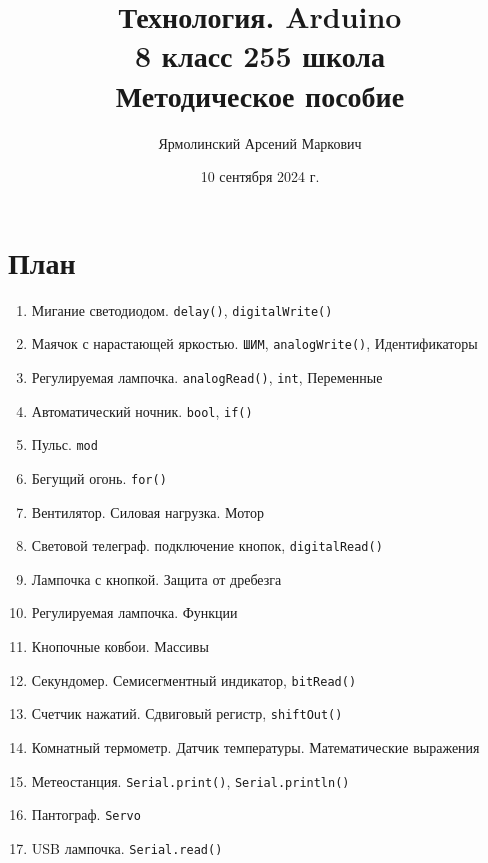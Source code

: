 \documentclass[14pt]{extarticle}
\title{Технология. Arduino \\ 8 класс 255 школа \\
 Методическое пособие}
\author{Ярмолинский Арсений Маркович}
\date{10 сентября 2024 г. }
\begin{document}
\maketitle
\tableofcontents



\section{План}

\begin{enumerate}
    \item Мигание светодиодом. \texttt{delay()}, \texttt{digitalWrite()}
    \item Маячок с нарастающей яркостью. \texttt{ШИМ}, \texttt{analogWrite()}, Идентификаторы
    \item Регулируемая лампочка. \texttt{analogRead()}, \texttt{int}, Переменные
    \item Автоматический ночник. \texttt{bool}, \texttt{if()}
    \item Пульс. \texttt{mod}
    \item Бегущий огонь. \texttt{for()}
    \item Вентилятор. Силовая нагрузка. Мотор
    \item Световой телеграф. подключение кнопок, \texttt{digitalRead()}
    \item Лампочка с кнопкой. Защита от дребезга
    \item Регулируемая лампочка. Функции
    \item Кнопочные ковбои. Массивы
    \item Секундомер. Семисегментный индикатор, \texttt{bitRead()}
    \item Счетчик нажатий. Сдвиговый регистр, \texttt{shiftOut()}
    \item Комнатный термометр. Датчик температуры. Математические выражения
    \item Метеостанция. \texttt{Serial.print()}, \texttt{Serial.println()}
    \item Пантограф. \texttt{Servo}
    \item USB лампочка. \texttt{Serial.read()}
\end{enumerate}








\end{document}
